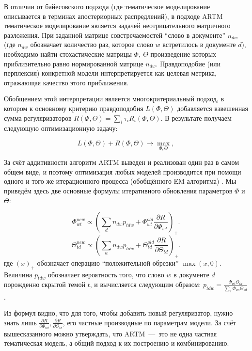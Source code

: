 В отличии от байесовского подхода (где тематическое моделирование описывается в терминах апостериорных распредлений), в подходе ARTM тематическое моделирование является задачей неотрицательного матричного разложения. При заданной матрице совстречаемостей ``слово в документе''  $n_{dw}$ (где $n_{dw}$ обозначает количество раз, которое слово  $w$ встретилось в документе $d$), необходимо найти стохастические матрицы $\Phi,~\Theta$ произведение которых приблизительно равно нормированной матрице $n_{dw}$. Правдоподобие (или перплексия) конкретной модели интерпретируется как целевая метрика, отражающая качество этого приближения.

Обобщением этой интерпретации является многокритериальный подход, в котором к основному критерию правдоподобия $L(\Phi, \Theta)$ 
добавляется взвешенная сумма регуляризаторов $R(\Phi, \Theta) = \sum_i \tau_i R_i(\Phi, \Theta)$. В результате получаем следующую оптимизационную задачу:

\begin{equation} \label{eq:EM}
L(\Phi, \Theta) + R(\Phi, \Theta) \to \max_{\Phi, \Theta},
\end{equation}

За счёт аддитивности алгоритм ARTM  выведен и реализован один раз в самом общем виде, и поэтому оптимизация любых моделей  производится при помощи одного и того же итерационного процесса  (обобщённого EM-алгоритма)  \cite{vorontsov2014additive,vorontsov2015}. Мы приведём здесь две основные формулы итеративного обновления параметров $\Phi$ и $\Theta$:

\begin{equation} \label{eq:Mstep_Theta}
\Phi_{wt}^{new}  \propto \left( \sum_{d} n_{dw} p_{tdw} + \Phi_{wt}^{old} \frac{\partial{R}}{\partial{\Phi_{wt}}}\right)_{+}.
\end{equation}
\[
\Theta_{td}^{new}  \propto \left( \sum_{w} n_{dw} p_{tdw} + \Theta_{td}^{old} \frac{\partial{R}}{\partial{\Theta_{td}}}\right)_{+}.
\]
где $\left( x \right)_{+}$ обозначает операцию ``положительной обрезки'' $\max(x, 0)$. Величина $p_{tdw}$ обозначает вероятность того, что слово $w$ в документе $d$ порожденно скрытой темой $t$, и вычисляется следующим образом: $p_{tdw} = \frac{\Phi_{wt} \Theta_{td}}{\sum_s \Phi_{ws} \Theta_{sd}}$.

Из формул видно, что для того, чтобы добавить новый регуляризатор, нужно знать лишь $\frac{\partial{R}}{\partial{\Phi_{wt}}}, \frac{\partial{R}}{\partial{\Theta_{td}}}$, его частные производные по параметрам модели. За счёт вышесказанного можно утверждать, что ARTM~---~это не одна частная тематическая модель, а общий подход к их построению и комбинированию.

